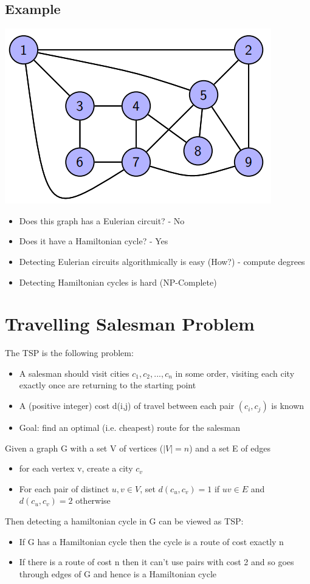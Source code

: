 \documentclass{article}[18pt]
\begin{document}
\subsection{Example}
\begin{center}
	\includegraphics[scale=0.7]{Hamiltonian}
\end{center}
\begin{itemize}
	\item Does this graph has a Eulerian circuit? - No
	\item Does it have a Hamiltonian cycle? - Yes
	\item Detecting Eulerian circuits algorithmically is easy (How?) - compute degrees
	\item Detecting Hamiltonian cycles is hard (NP-Complete)
\end{itemize}

\section{Travelling Salesman Problem}
The TSP is the following problem:
\begin{itemize}
	\item A salesman should visit cities $c_1,c_2,...,c_n$ in some order, visiting each city exactly once are returning to the starting point
	\item A (positive integer) cost d(i,j) of travel between each pair $(c_i,c_j)$ is known
	\item Goal: find an optimal (i.e. cheapest) route for the salesman
\end{itemize}
Given a graph G with a set V of vertices ($|V|=n$) and a set E of edges
\begin{itemize}
	\item for each vertex v, create a city $c_v$
	\item For each pair of distinct $u,v\in V$, set $d(c_u,c_v)=1$ if $uv\in E$ and $d(c_u,c_v)=2$ otherwise
\end{itemize}
Then detecting a hamiltonian cycle in G can be viewed as TSP:
\begin{itemize}
	\item If G has a Hamiltonian cycle then the cycle is a route of cost exactly n
	\item If there is a route of cost n then it can't use pairs with cost 2 and so goes through edges of G and hence is a Hamiltonian cycle
\end{itemize}
\end{document}
